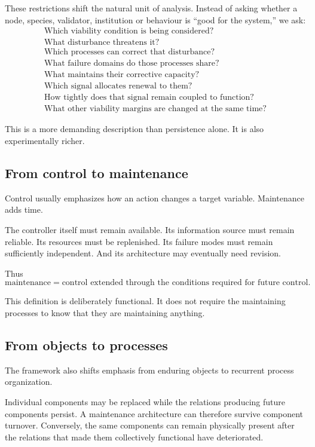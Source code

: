 These restrictions shift the natural unit of analysis. Instead of asking whether a node, species, validator, institution or behaviour is ``good for the system,'' we ask:
\[
\boxed{
\begin{array}{l}
\text{Which viability condition is being considered?}\\
\text{What disturbance threatens it?}\\
\text{Which processes can correct that disturbance?}\\
\text{What failure domains do those processes share?}\\
\text{What maintains their corrective capacity?}\\
\text{Which signal allocates renewal to them?}\\
\text{How tightly does that signal remain coupled to function?}\\
\text{What other viability margins are changed at the same time?}
\end{array}
}
\]

This is a more demanding description than persistence alone. It is also experimentally richer.

\subsection{From control to maintenance}

Control usually emphasizes how an action changes a target variable. Maintenance adds time.

The controller itself must remain available. Its information source must remain reliable. Its resources must be replenished. Its failure modes must remain sufficiently independent. And its architecture may eventually need revision.

Thus
\[
\boxed{
\text{maintenance}
=
\text{control extended through the conditions required for future control}.
}
\]

This definition is deliberately functional. It does not require the maintaining processes to know that they are maintaining anything.

\subsection{From objects to processes}

The framework also shifts emphasis from enduring objects to recurrent process organization.

Individual components may be replaced while the relations producing future components persist. A maintenance architecture can therefore survive component turnover. Conversely, the same components can remain physically present after the relations that made them collectively functional have deteriorated.

